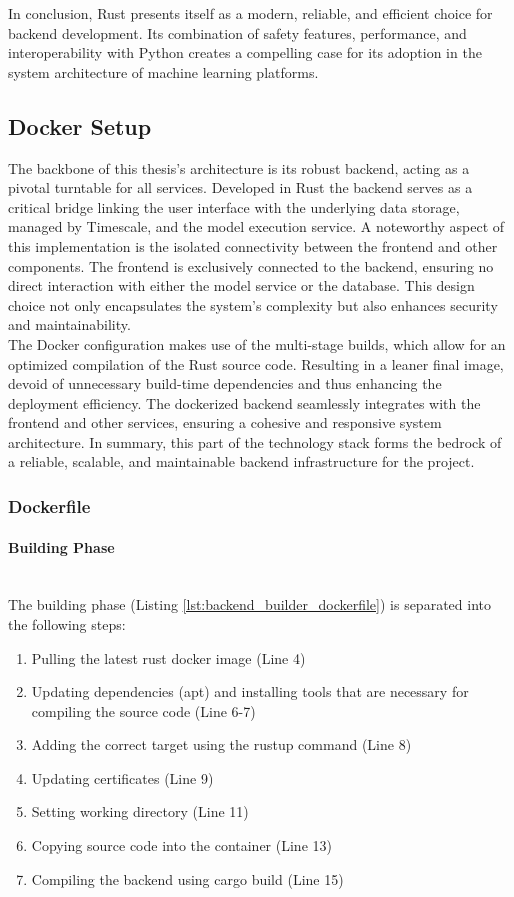 In conclusion, Rust presents itself as a modern, reliable, and efficient choice for backend development. Its combination of safety features, performance, and interoperability with Python creates a compelling case for its adoption in the system architecture of machine learning platforms.


\subsection{Docker Setup}
The backbone of this thesis's architecture is its robust backend, acting as a pivotal turntable for all services. Developed in Rust the backend serves as a critical bridge linking the user interface with the underlying data storage, managed by Timescale, and the model execution service. A noteworthy aspect of this implementation is the isolated connectivity between the frontend and other components. The frontend is exclusively connected to the backend, ensuring no direct interaction with either the model service or the database. This design choice not only encapsulates the system's complexity but also enhances security and maintainability. \\

The Docker configuration makes use of the multi-stage builds, which allow for an optimized compilation of the Rust source code. Resulting in a leaner final image, devoid of unnecessary build-time dependencies and thus enhancing the deployment efficiency. The dockerized backend seamlessly integrates with the frontend and other services, ensuring a cohesive and responsive system architecture. In summary, this part of the technology stack forms the bedrock of a reliable, scalable, and maintainable backend infrastructure for the project.

\subsubsection{Dockerfile}
\paragraph{Building Phase} \mbox{} \\
The building phase (Listing \ref{lst:backend_builder_dockerfile}) is separated into the following steps:
\begin{enumerate}
    \item Pulling the latest rust docker image (Line 4)
    \item Updating dependencies (apt) and installing tools that are necessary for compiling the source code (Line 6-7)
    \item Adding the correct target using the rustup command (Line 8) 
    \item Updating certificates (Line 9)
    \item Setting working directory (Line 11) 
    \item Copying source code into the container (Line 13)
    \item Compiling the backend using cargo build (Line 15)
\end{enumerate}

